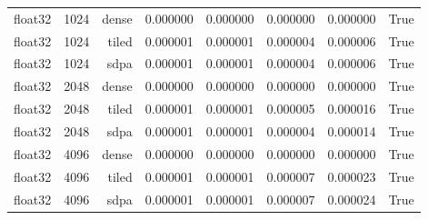 \begin{tabular}{lrrrrrrr}
float32 & 1024 & dense & 0.000000 & 0.000000 & 0.000000 & 0.000000 & True \\
float32 & 1024 & tiled & 0.000001 & 0.000001 & 0.000004 & 0.000006 & True \\
float32 & 1024 & sdpa & 0.000001 & 0.000001 & 0.000004 & 0.000006 & True \\
float32 & 2048 & dense & 0.000000 & 0.000000 & 0.000000 & 0.000000 & True \\
float32 & 2048 & tiled & 0.000001 & 0.000001 & 0.000005 & 0.000016 & True \\
float32 & 2048 & sdpa & 0.000001 & 0.000001 & 0.000004 & 0.000014 & True \\
float32 & 4096 & dense & 0.000000 & 0.000000 & 0.000000 & 0.000000 & True \\
float32 & 4096 & tiled & 0.000001 & 0.000001 & 0.000007 & 0.000023 & True \\
float32 & 4096 & sdpa & 0.000001 & 0.000001 & 0.000007 & 0.000024 & True \\
\bottomrule
\end{tabular}
